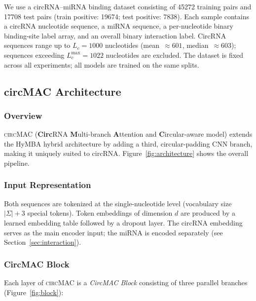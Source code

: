 \documentclass[11pt]{article}
\newcommand{\model}{\textsc{circMAC}}
\begin{document}
We use a circRNA--miRNA binding dataset consisting of
\num{45272} training pairs and \num{17708} test pairs
(train positive: \num{19674}; test positive: \num{7838}).
Each sample contains a circRNA nucleotide sequence, a miRNA sequence,
a per-nucleotide binary binding-site label array, and an overall
binary interaction label.
CircRNA sequences range up to $L_c = 1000$ nucleotides
(mean~$\approx 601$, median~$\approx 603$); sequences exceeding
$L_c^{\max} = 1022$ nucleotides are excluded.
The dataset is fixed across all experiments; all models are trained on the
same splits.


\subsection{circMAC Architecture}

\subsubsection{Overview}

\model{} (\textbf{Circ}RNA \textbf{M}ulti-branch \textbf{A}ttention and
\textbf{C}ircular-aware model) extends the HyMBA hybrid architecture
\cite{hymba} by adding a third, circular-padding CNN branch, making it
uniquely suited to circRNA.
Figure~\ref{fig:architecture} shows the overall pipeline.

\subsubsection{Input Representation}

Both sequences are tokenized at the single-nucleotide level (vocabulary size
$|\Sigma|+3$ special tokens).
Token embeddings of dimension $d$ are produced by a learned embedding table
followed by a dropout layer.
The circRNA embedding serves as the main encoder input; the miRNA is encoded
separately (see Section~\ref{sec:interaction}).

\subsubsection{CircMAC Block}

Each layer of \model{} is a \emph{CircMAC Block} consisting of three parallel
branches (Figure~\ref{fig:block}):
\end{document}

